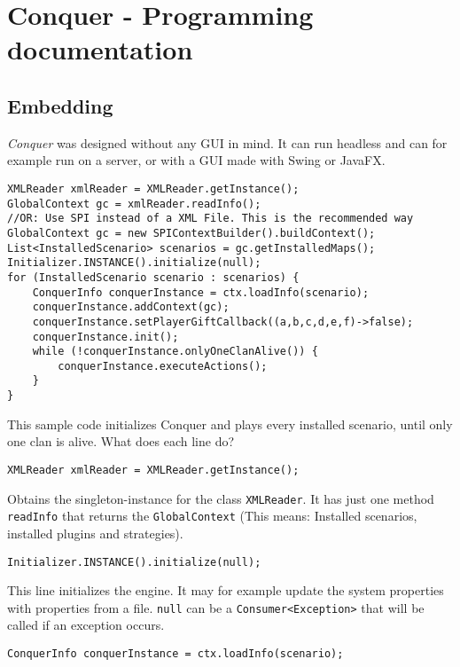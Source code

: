 \documentclass{article}
\begin{document}
    \tableofcontents
    \newpage


    \section{Conquer - Programming documentation}

    \subsection{Embedding}
    \textit{Conquer} was designed without any GUI in mind.
    It can run headless and can for example run on a server, or with a GUI made with Swing or JavaFX\@.
    \begin{verbatim}
XMLReader xmlReader = XMLReader.getInstance();
GlobalContext gc = xmlReader.readInfo();
//OR: Use SPI instead of a XML File. This is the recommended way
GlobalContext gc = new SPIContextBuilder().buildContext();
List<InstalledScenario> scenarios = gc.getInstalledMaps();
Initializer.INSTANCE().initialize(null);
for (InstalledScenario scenario : scenarios) {
	ConquerInfo conquerInstance = ctx.loadInfo(scenario);
	conquerInstance.addContext(gc);
	conquerInstance.setPlayerGiftCallback((a,b,c,d,e,f)->false);
	conquerInstance.init();
	while (!conquerInstance.onlyOneClanAlive()) {
		conquerInstance.executeActions();
	}
}
    \end{verbatim}
    This sample code initializes Conquer and plays every installed scenario, until only one clan is alive.\newline
    What does each line do?\newline
    \begin{verbatim}
XMLReader xmlReader = XMLReader.getInstance();
    \end{verbatim}
    Obtains the singleton-instance for the class \texttt{XMLReader}.
    It has just one method \texttt{readInfo} that returns the \texttt{GlobalContext} (This means: Installed scenarios,
    installed plugins and strategies).
    \begin{verbatim}
Initializer.INSTANCE().initialize(null);
    \end{verbatim}
    This line initializes the engine.
    It may for example update the system properties with properties from a file. \texttt{null} can be a \texttt{Consumer<Exception>} that will be called if an exception
    occurs.
    \begin{verbatim}
ConquerInfo conquerInstance = ctx.loadInfo(scenario);
    \end{verbatim}
\end{document}
